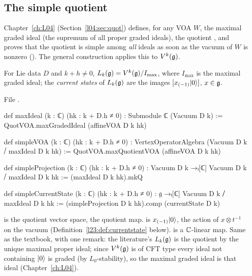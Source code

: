\subsection{The simple quotient}

Chapter~\ref{ch:L04} (Section~\ref{l04:sec:quot}) defines, for any VOA $W$, the maximal graded ideal
 (the supremum of all proper graded ideals), the quotient , and proves that
the quotient is simple among \emph{all} ideals as soon as the vacuum of $W$ is nonzero
(). The general construction applies this to $V^k(\mathfrak g)$.

\begin{definition}\label{l23:def:simpleVOA}
For Lie data $D$ and $k+h\ne0$, $L_k(\mathfrak g)=V^k(\mathfrak g)/I_{\max}$, where $I_{\max}$ is the maximal graded ideal; the
\emph{current states} of $L_k(\mathfrak g)$ are the images $[x_{(-1)}|0\rangle]$, $x\in\mathfrak g$.
\end{definition}
\noindent File .
\begin{leancode}
def maxIdeal (k : ℂ) (hk : k + D.h ≠ 0) : Submodule ℂ (Vacuum D k) :=
  QuotVOA.maxGradedIdeal (affineVOA D k hk)

def simpleVOA (k : ℂ) (hk : k + D.h ≠ 0) : VertexOperatorAlgebra (Vacuum D k ⧸ maxIdeal D k hk) :=
  QuotVOA.maxQuotientVOA (affineVOA D k hk)

def simpleProjection (k : ℂ) (hk : k + D.h ≠ 0) : Vacuum D k →ₗ[ℂ] Vacuum D k ⧸ maxIdeal D k hk :=
  (maxIdeal D k hk).mkQ

def simpleCurrentState (k : ℂ) (hk : k + D.h ≠ 0) : 𝔤 →ₗ[ℂ] Vacuum D k ⧸ maxIdeal D k hk :=
  (simpleProjection D k hk).comp (currentState D k)
\end{leancode}

\begin{dictionary}
 is the quotient vector space,  the quotient map.  is
$x_{(-1)}|0\rangle$, the action of $x\otimes t^{-1}$ on the vacuum (Definition~\ref{l23:def:currentstate} below).
 is a ${\mathbb{C}}$-linear map. Same as the textbook, with one remark: the literature's $L_k(\mathfrak g)$ is the quotient
by the unique maximal proper ideal; since $V^k(\mathfrak g)$ is of CFT type every ideal not containing $|0\rangle$ is graded (by
$L_0$-stability), so the maximal graded ideal is that ideal (Chapter~\ref{ch:L04}).
\end{dictionary}

